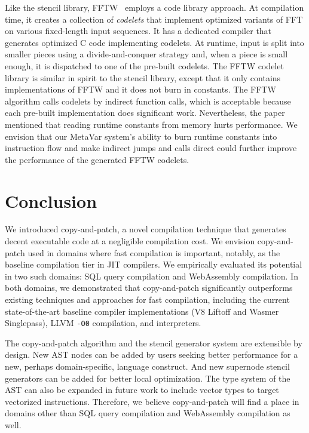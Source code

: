 \documentclass[acmsmall,nonacm,screen]{acmart}\settopmatter{printfolios=true,printccs=true,printacmref=false}
\newcommand{\llvm}{LLVM}
\newcommand{\ozero}{\texttt{-O0}}
\newcommand{\cp}{copy-and-patch}
\begin{document}
Like the stencil library, FFTW~\cite{frigo1998} employs a code library approach. At compilation time, it creates a collection of \textit{codelets} that implement optimized variants of FFT on various fixed-length input sequences. It has a dedicated compiler that generates optimized C code implementing codelets. At runtime, input is split into smaller pieces using a divide-and-conquer strategy and, when a piece is small enough, it is dispatched to one of the pre-built codelets. The FFTW codelet library is similar in spirit to the stencil library, except that it only contains implementations of FFTW and it does not burn in constants.  The FFTW algorithm calls codelets by indirect function calls,  which is acceptable because each pre-built implementation does significant work. Nevertheless, the paper mentioned that reading runtime constants from memory hurts performance. We envision that our MetaVar system's ability to burn runtime constants into instruction flow and make indirect jumps and calls direct could further improve the performance of the generated FFTW codelets.



\section{Conclusion}
\label{sec:conclusion}

We introduced \cp{}, a novel compilation technique that generates decent executable code at a negligible compilation cost. We envision \cp{} used in domains where fast compilation is important, notably, as the baseline compilation tier in JIT compilers. We empirically evaluated its potential in two such domains: SQL query compilation and WebAssembly compilation. In both domains, we demonstrated that \cp{} significantly outperforms existing techniques and approaches for fast compilation, including the current state-of-the-art baseline compiler implementations (V8 Liftoff and Wasmer Singlepass), \llvm{} \ozero{} compilation, and interpreters. 

The \cp{} algorithm and the stencil generator system are extensible by design. New AST nodes can be added by users seeking better performance for a new, perhaps domain-specific, language construct. And new supernode stencil generators can be added for better local optimization. The type system of the AST can also be expanded in future work to include vector types to target vectorized instructions. Therefore, we believe \cp{} will find a place in domains other than SQL query compilation and WebAssembly compilation as well.
\end{document}
